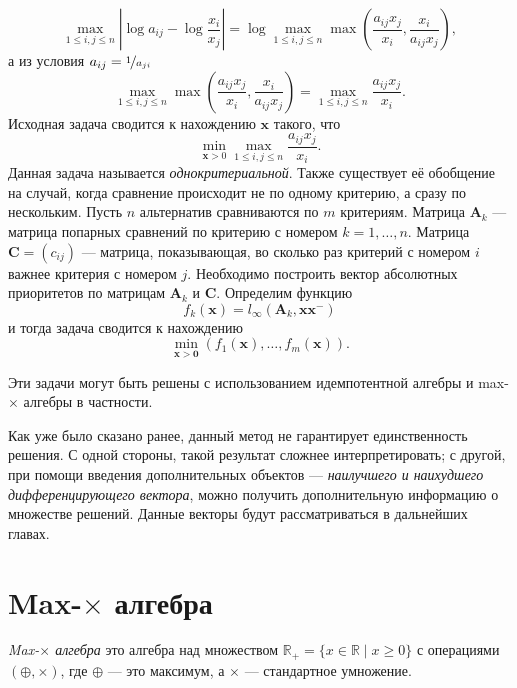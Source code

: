 \documentclass[specialist,
	substylefile = spbu.rtx,
	subf,href,colorlinks=true, 12pt]{disser}
\begin{document}
\[
\max _{1 \leq i, j \leq n}\left|\log a_{i j}-\log \frac{x_{i}}{x_{j}}\right| = \log \max_{1 \leq i, j \leq n} \max\left(\frac{a_{ij}x_j}{x_i}, \frac{x_i}{a_{ij}x_j}\right),
\]
а из условия $a_{ij} = \nicefrac{1}{a_{ji}}$
\[
\max_{1 \leq i, j \leq n} \max\left(\frac{a_{ij}x_j}{x_i}, \frac{x_i}{a_{ij}x_j}\right) = \max_{1 \leq i, j \leq n} \frac{a_{ij}x_j}{x_i}.
\]
Исходная задача сводится \cite{krivulin2017} к нахождению $\mathbf{x}$ такого, что
\[
	\min _{\mathbf{x}>0} \max _{1 \leq i, j \leq n} \frac{a_{i j} x_{j}}{x_{i}}.
\]
Данная задача называется \textit{однокритериальной}. Также существует её обобщение на случай, когда сравнение происходит не по одному критерию, а сразу по нескольким.
Пусть $n$ альтернатив сравниваются по $m$ критериям.
Матрица $\mathbf{A}_k$ --- матрица попарных сравнений по критерию с номером $k = 1, \dots, n$.
Матрица $\mathbf{C} = (c_{ij})$ --- матрица, показывающая, во сколько раз критерий с номером $i$ важнее критерия с номером $j$. Необходимо построить вектор абсолютных приоритетов по матрицам $\mathbf{A}_k$ и $\mathbf{C}$.
Определим функцию
$$
f_{k}(\mathbf{x})=l_{\infty}\left(\mathbf{A}_{k}, \mathbf{x} \mathbf{x}^{-}\right)
$$ и тогда задача сводится к нахождению
$$
\min _{\mathbf{x}>\mathbf{0}}\left(f_{1}(\mathbf{x}), \ldots, f_{m}(\mathbf{x})\right).
$$

Эти задачи могут быть решены с использованием идемпотентной алгебры и max-$\times$ алгебры в частности.

Как уже было сказано ранее, данный метод не гарантирует единственность решения. С одной стороны, такой результат сложнее интерпретировать; с другой, при помощи введения дополнительных объектов --- \textit{наилучшего и наихудшего дифференцирующего вектора}, можно получить дополнительную информацию о множестве решений. Данные векторы будут рассматриваться в дальнейших главах.

\section{Max-$\times$ алгебра}

\begin{definition}
	\textit{Max-$\times$ алгебра}
	это алгебра над множеством $\mathbb{R}_{+} = \{x \in \mathbb{R} \mid x \geq 0\}$ с операциями ${(\oplus, \times)}$, где $\oplus$ --- это максимум, а $\times$ --- стандартное умножение.
\end{definition}
\end{document}

